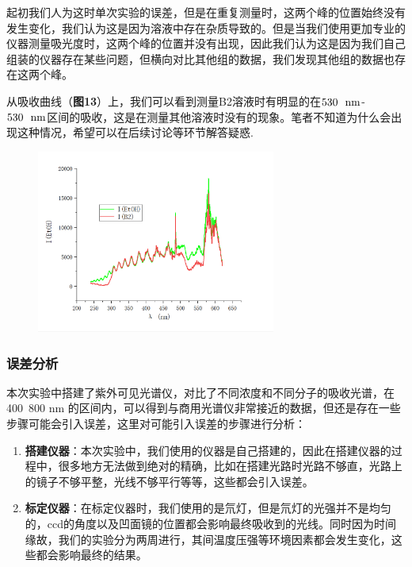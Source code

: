 \documentclass[12pt]{article}
\begin{document}
					起初我们人为这时单次实验的误差，但是在重复测量时，这两个峰的位置始终没有发生变化，我们认为这是因为溶液中存在杂质导致的。但是当我们使用更加专业的仪器测量吸光度时，这两个峰的位置并没有出现，因此我们认为这是因为我们自己组装的仪器存在某些问题，但横向对比其他组的数据，我们发现其他组的数据也存在这两个峰。\par
					从吸收曲线（\textbf{图13}）上，我们可以看到测量B2溶液时有明显的在$530\ \ {\rm nm}$-$530\ \ {\rm nm}$区间的吸收，这是在测量其他溶液时没有的现象。笔者不知道为什么会出现这种情况，希望可以在后续讨论等环节解答疑惑.\par
					\begin{figure}[h]
						\centering
						\includegraphics[width=0.7\textwidth]{12.png}
					\end{figure}
					\par
					\subsubsection{误差分析}
					本次实验中搭建了紫外可见光谱仪，对比了不同浓度和不同分子的吸收光谱，在400~800 nm 的区间内，可以得到与商用光谱仪非常接近的数据，但还是存在一些步骤可能会引入误差，这里对可能引入误差的步骤进行分析：
					\begin{enumerate}
						\item \textbf{搭建仪器}：本次实验中，我们使用的仪器是自己搭建的，因此在搭建仪器的过程中，很多地方无法做到绝对的精确，比如在搭建光路时光路不够直，光路上的镜子不够平整，光线不够平行等等，这些都会引入误差。
						\item \textbf{标定仪器}：在标定仪器时，我们使用的是氘灯，但是氘灯的光强并不是均匀的，ccd的角度以及凹面镜的位置都会影响最终吸收到的光线。同时因为时间缘故，我们的实验分为两周进行，其间温度压强等环境因素都会发生变化，这些都会影响最终的结果。
					\end{enumerate} \par
\end{document}

